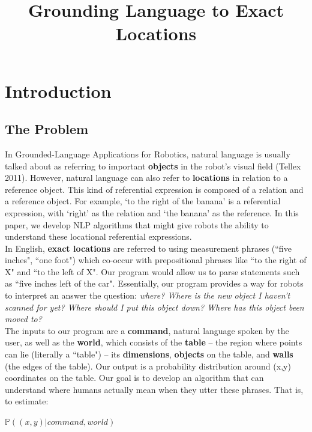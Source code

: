 \documentclass[12pt,letterpaper]{article}
\title{Grounding Language to Exact Locations}
\newcommand\tab[1][1cm]{\hspace*{#1}}
\newcommand\prob{\mathbb{P}}
\begin{document}
\maketitle
\section{Introduction}

\subsection{The Problem}

\tab In Grounded-Language Applications for Robotics, natural language is usually talked about as referring to important \textbf{objects} in the robot's visual field (Tellex 2011). However, natural language can also refer to \textbf{locations} in relation to a reference object. This kind of referential expression is composed of a relation and a reference object. For example, `to the right of the banana' is a referential expression, with `right' as the relation and `the banana' as the reference. In this paper, we develop NLP algorithms that might give robots the ability to understand these locational referential expressions.\\
\tab In English, \textbf{exact locations} are referred to using measurement phrases (``five inches", ``one foot") which co-occur with prepositional phrases like ``to the right of X" and ``to the left of X". Our program would allow us to parse statements such as ``five inches left of the car". Essentially, our program provides a way for robots to interpret an answer the question: \textit{where? Where is the new object I haven't scanned for yet? Where should I put this object down? Where has this object been moved to?}\\
\tab The inputs to our program are a \textbf{command}, natural language spoken by the user, as well as the \textbf{world}, which consists of the \textbf{table} \--- the region where points can lie (literally a ``table") \--- its \textbf{dimensions}, \textbf{objects} on the table, and \textbf{walls} (the edges of the table). Our output is a probability distribution around (x,y) coordinates on the table. Our goal is to develop an algorithm that can understand where humans actually mean when they utter these phrases. That is, to estimate:

\begin{center}
$\prob((x,y) | command, world)$
\end{center}
\end{document}
